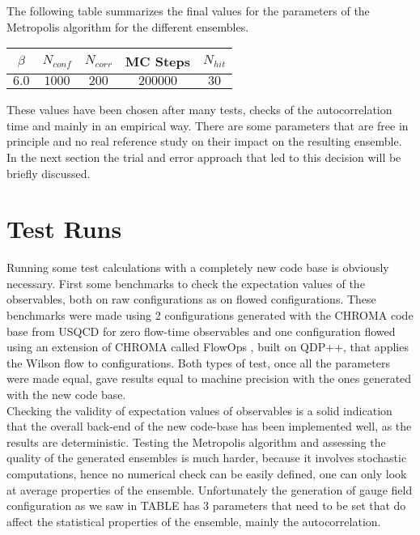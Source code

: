 The following table summarizes the final values for the parameters of the Metropolis algorithm for the different ensembles.
\begin{table}[!htb]
    \begin{center}
    \begin{tabular}{ccccc}
        $\beta$ & $N_{conf}$ & $N_{corr}$ & MC Steps & $N_{hit}$ \\\hline
        $6.0$ & $1000$ & $200$ & $200000$ & $30$
    \end{tabular}
    \label{runs:mcparams}
    \end{center}
\end{table}
These values have been chosen after many tests, checks of the autocorrelation time and mainly in an empirical way. There are some parameters that are free in principle and no real reference study on their impact on the resulting ensemble. In the next section the trial and error approach that led to this decision will be briefly discussed.

\section{Test Runs}
Running some test calculations with a completely new code base is obviously necessary. First some benchmarks to check the expectation values of the observables, both on raw configurations as on flowed configurations. These benchmarks were made using 2 configurations generated with the CHROMA \CIT code base from USQCD for zero flow-time observables and one configuration flowed using an extension of CHROMA called FlowOps \CIT, built on QDP++, that applies the Wilson flow to configurations. Both types of test, once all the parameters were made equal, gave results equal to machine precision with the ones generated with the new code base.\\
Checking the validity of expectation values of observables is a solid indication that the overall back-end of the new code-base has been implemented well, as the results are deterministic. Testing the Metropolis algorithm and assessing the quality of the generated ensembles is much harder, because it involves stochastic computations, hence no numerical check can be easily defined, one can only look at average properties of the ensemble. Unfortunately the generation of gauge field configuration as we saw in \LINK TABLE has 3 parameters that need to be set that do affect the statistical properties of the ensemble, mainly the autocorrelation. \\

